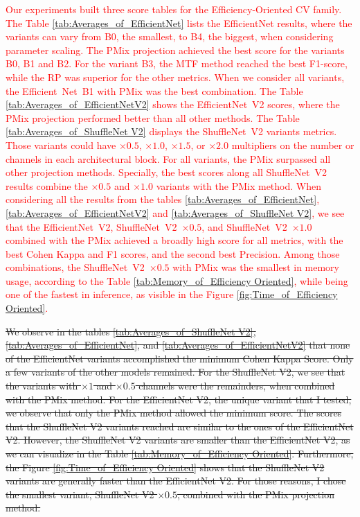 \textcolor{red}{
Our experiments built three score tables for the Efficiency-Oriented \gls{CV} family.
The Table \ref{tab:Averages_of_EfficientNet} lists the EfficientNet results, where the variants can vary from B0, the smallest, to B4, the biggest, when considering parameter scaling. The \gls{PMix} projection achieved the best score for the variants B0, B1 and B2. For the variant B3, the \gls{MTF} method reached the best F1-score, while the \gls{RP} was superior for the other metrics. When we consider all variants, the \mbox{Efficient Net B1} with \gls{PMix} was the best combination.
The Table \ref{tab:Averages_of_EfficientNetV2} shows the \mbox{EfficientNet V2} scores, where the \gls{PMix} projection performed better than all other methods.
The Table \ref{tab:Averages_of_ShuffleNet V2} displays the \mbox{ShuffleNet V2} variants metrics. Those variants could have $\times 0.5$, $\times 1.0$, $\times 1.5$, or $\times 2.0$ multipliers on the number or channels in each architectural block. For all variants, the \gls{PMix} surpassed all other projection methods. Specially, the best scores along all \mbox{ShuffleNet V2} results combine the $\times 0.5$ and $\times 1.0$ variants with the \gls{PMix} method.
When considering all the results from the tables \ref{tab:Averages_of_EfficientNet}, \ref{tab:Averages_of_EfficientNetV2} and \ref{tab:Averages_of_ShuffleNet V2}, we see that the \mbox{EfficientNet V2}, \mbox{ShuffleNet V2 $\times 0.5$}, and \mbox{ShuffleNet V2 $\times 1.0$} combined with the \gls{PMix} achieved a broadly high score for all metrics, with the best Cohen Kappa and F1 scores, and the second best Precision. Among those combinations, the \mbox{ShuffleNet V2 $\times 0.5$} with \gls{PMix} was the smallest in memory usage, according to the Table \ref{tab:Memory_of_Efficiency Oriented}, while being one of the fastest in inference, as visible in the Figure \ref{fig:Time_of_Efficiency Oriented}.
}

\sout{
We observe in the tables \ref{tab:Averages_of_ShuffleNet V2}, \ref{tab:Averages_of_EfficientNet}, and \ref{tab:Averages_of_EfficientNetV2} that none of the EfficientNet variants accomplished the minimum Cohen Kappa Score. Only a few variants of the other models remained. For the ShuffleNet V2, we see that the variants with $\times 1$ and $\times 0.5$ channels were the remainders, when combined with the \gls{PMix} method. For the EfficientNet V2, the unique variant that I tested, we observe that only the \gls{PMix} method allowed the minimum score. The scores that the ShuffleNet V2 variants reached are similar to the ones of the EfficientNet V2. However, the ShuffleNet V2 variants are smaller than the EfficientNet V2, as we can visualize in the Table \ref{tab:Memory_of_Efficiency Oriented}. Furthermore, the Figure \ref{fig:Time_of_Efficiency Oriented} shows that the ShuffleNet V2 variants are generally faster than the EfficientNet V2. For those reasons, I chose the smallest variant, ShuffleNet V2 $\times 0.5$, combined with the \gls{PMix} projection method. 
}


